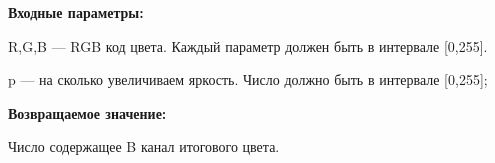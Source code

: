 \textbf{Входные параметры:}  

R,G,B --- RGB код цвета. Каждый параметр должен быть в интервале [0,255].

p --- на сколько увеличиваем яркость. Число должно быть в интервале [0,255];

\textbf{Возвращаемое значение:}

Число содержащее B канал итогового цвета.